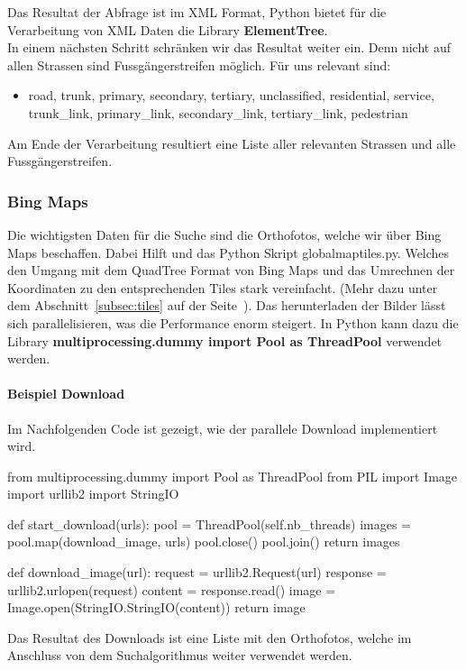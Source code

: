 Das Resultat der Abfrage ist im XML Format, Python bietet für die Verarbeitung von XML Daten die Library \textbf{ElementTree}.\\
In einem nächsten Schritt schränken wir das Resultat weiter ein. Denn nicht auf allen Strassen sind Fussgängerstreifen möglich. Für uns relevant sind:
\begin{itemize}
	\item road, trunk, primary, secondary, tertiary, unclassified, residential, service, trunk\_link, primary\_link, secondary\_link, tertiary\_link, pedestrian
\end{itemize}

Am Ende der Verarbeitung resultiert eine Liste aller relevanten Strassen und alle Fussgängerstreifen.

\subsubsection{Bing Maps}
Die wichtigsten Daten für die Suche sind die Orthofotos, welche wir über Bing Maps beschaffen. Dabei Hilft und das Python Skript globalmaptiles.py. Welches den Umgang mit dem QuadTree Format von Bing Maps und das Umrechnen der Koordinaten zu den entsprechenden Tiles stark vereinfacht. (Mehr dazu unter dem Abschnitt~\ref{subsec:tiles} auf der Seite~\pageref{subsec:tiles}). Das herunterladen der Bilder lässt sich parallelisieren, was die Performance enorm steigert. In Python kann dazu die Library \textbf{multiprocessing.dummy import Pool as ThreadPool} verwendet werden.

\paragraph{Beispiel Download} Im Nachfolgenden Code ist gezeigt, wie der parallele Download implementiert wird. \\
\begin{python}
from multiprocessing.dummy import Pool as ThreadPool
from PIL import Image
import urllib2
import StringIO

def start_download(urls):
     pool = ThreadPool(self.nb_threads)       
     images = pool.map(download_image, urls)
     pool.close()
     pool.join()
     return images

def download_image(url):
    request = urllib2.Request(url)
    response = urllib2.urlopen(request)
    content = response.read()
    image = Image.open(StringIO.StringIO(content))
    return image

\end{python}

Das Resultat des Downloads ist eine Liste mit den Orthofotos, welche im Anschluss von dem Suchalgorithmus weiter verwendet werden.



